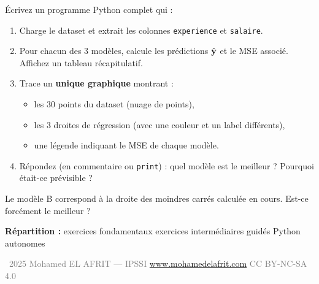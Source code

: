 \'{E}crivez un programme Python complet qui :

\begin{enumerate}[label=\alph*)]
    \item Charge le dataset et extrait les colonnes \texttt{experience} et \texttt{salaire}.

    \item Pour chacun des 3 mod\`{e}les, calcule les pr\'{e}dictions $\hat{\mathbf{y}}$
        et le MSE associ\'{e}. Affichez un tableau r\'{e}capitulatif.

    \item Trace un \textbf{unique graphique} montrant :
        \begin{itemize}
            \item les 30 points du dataset (nuage de points),
            \item les 3 droites de r\'{e}gression (avec une couleur et un label diff\'{e}rents),
            \item une l\'{e}gende indiquant le MSE de chaque mod\`{e}le.
        \end{itemize}

    \item R\'{e}pondez (en commentaire ou \texttt{print}) :
        quel mod\`{e}le est le meilleur ? Pourquoi \'{e}tait-ce pr\'{e}visible ?
\end{enumerate}

\begin{intuitionbox}[Indice]
    Le mod\`{e}le B correspond \`{a} la droite des moindres carr\'{e}s calcul\'{e}e en cours.
    Est-ce forc\'{e}ment le meilleur ?
\end{intuitionbox}

\vfill
\separateur

\begin{center}
    \small\sffamily
    \textbf{R\'{e}partition :} exercices  fondamentaux  exercices  interm\'{e}diaires  guid\'{e}s Python   autonomes 
\end{center}

\begin{center}
    {\footnotesize\sffamily\textcolor{gray}{%
        \textcopyright\ 2025 Mohamed EL AFRIT --- IPSSI \enspace\textbullet\enspace
        \url{www.mohamedelafrit.com} \enspace\textbullet\enspace
        CC BY-NC-SA 4.0
    }}
\end{center}



